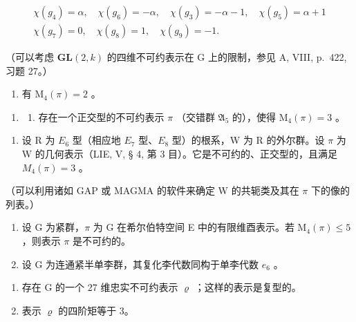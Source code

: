 \[
\begin{array}{c} \chi (g _ {4}) = \alpha , \quad \chi (g _ {6}) = - \alpha , \quad \chi (g _ {3}) = - \alpha - 1, \quad \chi (g _ {5}) = \alpha + 1 \\ \chi (g _ {7}) = 0, \quad \chi (g _ {8}) = 1, \quad \chi (g _ {9}) = - 1. \end{array}
\]

（可以考虑 \(\mathbf{GL}(2,k)\) 的四维不可约表示在 G 上的限制，参见 A, VIII, p.~422, 习题 27。）

\begin{enumerate}
\def\labelenumi{\alph{enumi})}
\setcounter{enumi}{2}
\tightlist
\item
  有 \(\mathrm{M}_4(\pi) = 2\) 。
\end{enumerate}

\begin{enumerate}
\def\labelenumi{\arabic{enumi})}
\setcounter{enumi}{9}
\tightlist
\item
  \begin{enumerate}
  \def\labelenumii{\alph{enumii})}
  \tightlist
  \item
    存在一个正交型的不可约表示 \(\pi\) （交错群 \(\mathfrak{A}_5\) 的），使得 \(\mathrm{M}_4(\pi) = 3\) 。
  \end{enumerate}
\end{enumerate}

\begin{enumerate}
\def\labelenumi{\alph{enumi})}
\setcounter{enumi}{1}
\tightlist
\item
  设 R 为 \(E_{6}\) 型（相应地 \(E_{7}\) 型、\(E_{8}\) 型）的根系，W 为 R 的外尔群。设 \(\pi\) 为 W 的几何表示（LIE, V, § 4, 第 3 目）。它是不可约的、正交型的，且满足 \(M_{4}(\pi)=3\) 。
\end{enumerate}

（可以利用诸如 GAP 或 MAGMA 的软件来确定 W 的共轭类及其在 \(\pi\) 下的像的列表。）

\begin{enumerate}
\def\labelenumi{\arabic{enumi})}
\setcounter{enumi}{10}
\item
  设 G 为紧群，\(\pi\) 为 G 在希尔伯特空间 E 中的有限维酉表示。若 \(\mathrm{M}_{4}(\pi) \leqslant 5\) ，则表示 \(\pi\) 是不可约的。
\item
  设 G 为连通紧半单李群，其复化李代数同构于单李代数 \(e_{6}\) 。
\end{enumerate}

\begin{enumerate}
\def\labelenumi{\alph{enumi})}
\item
  存在 G 的一个 27 维忠实不可约表示 \(\varrho\) ；这样的表示是复型的。
\item
  表示 \(\varrho\) 的四阶矩等于 3。
\end{enumerate}

